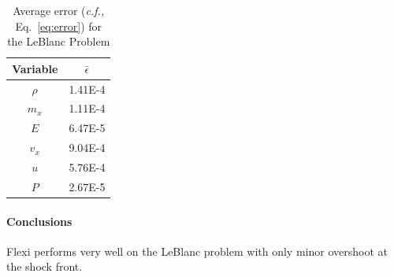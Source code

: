 \begin{table}[h!]
 \centering
 \begin{tabular}{|c|c|} \hline
   Variable & $\bar{\epsilon}$ \\ \hline \hline
   $\rho$ & 1.41E-4 \\
   $m_x$  & 1.11E-4 \\
   $E$      & 6.47E-5 \\ \hline
   $v_x$  & 9.04E-4 \\
   $u$     & 5.76E-4 \\
   $P$     & 2.67E-5 \\ \hline
 \end{tabular}
 \caption{Average error (\textit{c.f.,} Eq.~\ref{eq:error}) for the LeBlanc Problem}\label{tab:leblancEps}
\end{table}

\paragraph{Conclusions}

Flexi performs very well on the LeBlanc problem with only minor overshoot at the shock front.
